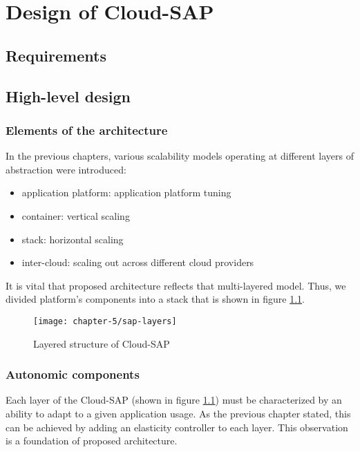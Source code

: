 \chapter{Design of Cloud-SAP}


\section{Requirements}

\section{High-level design}
\subsection{Elements of the architecture}
In the previous chapters, various scalability models operating at different layers of abstraction were introduced: 
\begin{itemize}
	\item application platform: application platform tuning
	\item container: vertical scaling
	\item stack: horizontal scaling
	\item inter-cloud: scaling out across different cloud providers
\end{itemize}

It is vital that proposed architecture reflects that multi-layered model. Thus, we divided platform's components into a stack that is shown in figure \ref{design:csap-layers}.

\begin{figure}[!ht]
  \begin{center}
    \texttt{[image: chapter-5/sap-layers]}
  \end{center}
  \caption{Layered structure of Cloud-SAP}
  \label{design:csap-layers}
\end{figure}

\subsection{Autonomic components}
Each layer of the Cloud-SAP (shown in figure \ref{design:csap-layers}) must be characterized by an ability to adapt to a given application usage. As the previous chapter stated, this can be achieved by adding an elasticity controller to each layer. This observation is a foundation of proposed architecture.

